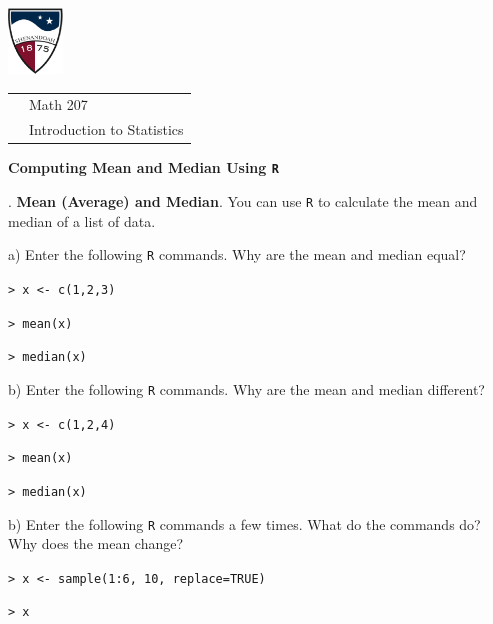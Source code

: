 \documentclass[10pt]{article}
\newcounter{EX}\setcounter{EX}{1}
\newcommand{\EXERCISE}{\arabic{EX}.\stepcounter{EX} }
\begin{document}
\pagestyle{empty}
\lstset{language=R, showspaces=false, showstringspaces=false}

\href{http://www.su.edu}{\includegraphics[height=1.75cm]{sulogo.eps}}
\vspace{-1.69cm}

{\small \hfill
\begin{tabular}{cl}
& Math 207\\ & Introduction to  Statistics\\
\end{tabular}
}
\setlength{\baselineskip}{1.05\baselineskip}

\begin{center}
\textbf{\large  Computing Mean and Median Using \texttt{R}}
\end{center}

\newcommand{\SUBX}{\hspace{10pt}}
\newcommand{\HX}{\hspace{10pt}}
\newcommand{\BSK}{\vspace{.14in}}

\EXERCISE \textbf{Mean (Average) and Median}.
You can use \texttt{R} to calculate the mean and median of a list of data.

\HX a) Enter the following \texttt{R} commands.  Why are the mean and median equal?

\HX\HX  \texttt{>  x <- c(1,2,3)}

\HX\HX  \texttt{>  mean(x)}

\HX\HX  \texttt{>  median(x)}
\smallskip

\HX b) Enter the following \texttt{R} commands.  Why are the mean and median different?

\HX\HX  \texttt{>  x <- c(1,2,4)}

\HX\HX  \texttt{>  mean(x)}

\HX\HX  \texttt{>  median(x)}
\smallskip

\HX b) Enter the following \texttt{R} commands a few times.   What do the commands do?
 Why does the mean change?

\HX\HX \texttt{>  x <- sample(1:6, 10, replace=TRUE)}

\HX\HX \texttt{>  x}
\end{document}
